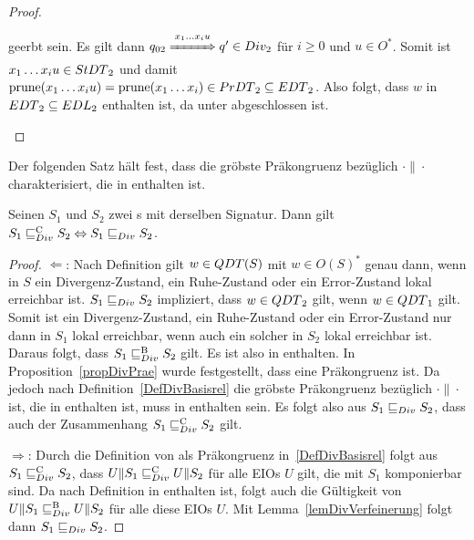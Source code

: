 \begin{proof}
\begin{itemize}
\begin{itemize}
          geerbt sein. Es gilt dann $q_{02} \overset{x_1\dots
          x_iu}{\xRightarrow{\hspace{1cm}}} q'\in Div_2$ für $i\geq 0$ und $u\in O^*$. Somit
          ist $x_1\dots x_iu\in StDT{}_2$ und damit $\mathrm{prune}{}(x_1\dots x_iu)=
          \mathrm{prune}{}(x_1\dots x_i)\in PrDT{}_2\subseteq EDT{}_2$. Also folgt,
          dass $w$ in $EDT{}_2 \subseteq EDL{}_2$ enthalten ist, da \DT{}
          unter \cont{} abgeschlossen ist.
      \end{itemize}
  \end{itemize}
\end{proof}

Der folgenden Satz hält fest, dass \DRel{} die gröbste Präkongruenz bezüglich
$\cdot\|\cdot$ charakterisiert, die in \DBRel{} enthalten ist.

\begin{satz}
\label{satzDivFullAbst}
  Seinen $S_1$ und $S_2$ zwei \EIO{}s mit derselben Signatur. Dann gilt $S_1
  \sqsubseteq _{Div}^\mathrm{C}{} S_2\Leftrightarrow S_1\sqsubseteq _{Div}{} S_2$.
\end{satz}

\begin{proof}
  \glqq{}$\Leftarrow$\grqq{}: Nach Definition gilt $w\in QDT{}(S)$ mit $w\in
  O(S)^*$ genau dann, wenn in $S$ ein Divergenz-Zustand, ein Ruhe-Zustand oder ein
  Error-Zustand lokal erreichbar ist. $S_1\sqsubseteq _{Div} S_2$ impliziert, dass
  $w\in QDT{}_2$ gilt, wenn $w\in QDT{}_1$ gilt. Somit ist ein Divergenz-Zustand,
  ein Ruhe-Zustand oder ein Error-Zustand nur dann in $S_1$ lokal erreichbar,
  wenn auch ein solcher in $S_2$ lokal erreichbar ist. Daraus folgt, dass
  $S_1\sqsubseteq _{Div}^\mathrm{B} S_2$ gilt. Es ist also \DRel{} in \DBRel{} enthalten. In
  Proposition~\ref{propDivPrae} wurde festgestellt, dass \DRel{} eine
  Präkongruenz ist. Da jedoch \DCRel{} nach Definition~\ref{DefDivBasisrel} die gröbste Präkongruenz
  bezüglich $\cdot\|\cdot$ ist, die in \DBRel{} enthalten ist, muss \DRel{} in
  \DCRel{} enthalten sein. Es folgt also aus $S_1\sqsubseteq _{Div} S_2$,
  dass auch der Zusammenhang $S_1\sqsubseteq _{Div}^\mathrm{C} S_2$ gilt.

  \glqq{}$\Rightarrow$\grqq{}: Durch die Definition von \DCRel{} als
  Präkongruenz in~\ref{DefDivBasisrel} folgt aus $S_1\sqsubseteq _{Div}^\mathrm{C}{} S_2$, dass
  $U\|S_1\sqsubseteq _{Div}^\mathrm{C} U\|S_2$ für alle EIOs $U$ gilt, die mit $S_1$ komponierbar sind.
  Da \DCRel{} nach Definition in \DBRel{} enthalten ist, folgt auch die
  Gültigkeit von $U\|S_1\sqsubseteq _{Div}^\mathrm{B} U\|S_2$ für alle diese EIOs $U$. Mit
  Lemma~\ref{lemDivVerfeinerung} folgt dann $S_1\sqsubseteq _{Div}{} S_2$.
\end{proof}

